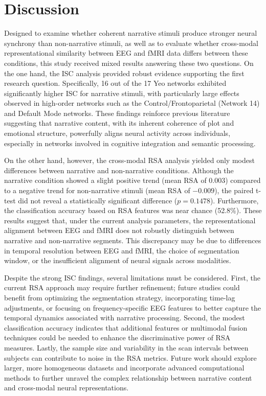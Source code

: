 \documentclass[stu,12pt,floatsintext]{apa7}
\begin{document}
\section{Discussion}
Designed to examine whether coherent narrative stimuli produce stronger neural synchrony than non-narrative stimuli, as well as to evaluate whether cross-modal representational similarity between EEG and fMRI data differs between these conditions, this study received mixed results answering these two questions. On the one hand, the ISC analysis provided robust evidence supporting the first research question. Specifically, 16 out of the 17 Yeo networks exhibited significantly higher ISC for narrative stimuli, with particularly large effects observed in high-order networks such as the Control/Frontoparietal (Network 14) and Default Mode networks. These findings reinforce previous literature suggesting that narrative content, with its inherent coherence of plot and emotional structure, powerfully aligns neural activity across individuals, especially in networks involved in cognitive integration and semantic processing.

On the other hand, however, the cross-modal RSA analysis yielded only modest differences between narrative and non-narrative conditions. Although the narrative condition showed a slight positive trend (mean RSA of 0.003) compared to a negative trend for non-narrative stimuli (mean RSA of $-0.009$), the paired t-test did not reveal a statistically significant difference ($p=0.1478$). Furthermore, the classification accuracy based on RSA features was near chance (52.8\%). These results suggest that, under the current analysis parameters, the representational alignment between EEG and fMRI does not robustly distinguish between narrative and non-narrative segments. This discrepancy may be due to differences in temporal resolution between EEG and fMRI, the choice of segmentation window, or the insufficient alignment of neural signals across modalities.

Despite the strong ISC findings, several limitations must be considered. First, the current RSA approach may require further refinement; future studies could benefit from optimizing the segmentation strategy, incorporating time-lag adjustments, or focusing on frequency-specific EEG features to better capture the temporal dynamics associated with narrative processing. Second, the modest classification accuracy indicates that additional features or multimodal fusion techniques could be needed to enhance the discriminative power of RSA measures. Lastly, the sample size and variability in the scan intervals between subjects can contribute to noise in the RSA metrics. Future work should explore larger, more homogeneous datasets and incorporate advanced computational methods to further unravel the complex relationship between narrative content and cross-modal neural representations.

\printbibliography
\end{document}
